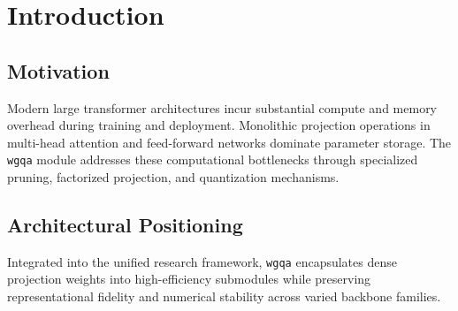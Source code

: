 \section{Introduction}

\subsection{Motivation}
Modern large transformer architectures incur substantial compute and memory overhead during training and deployment. Monolithic projection operations in multi-head attention and feed-forward networks dominate parameter storage. The \texttt{wgqa} module addresses these computational bottlenecks through specialized pruning, factorized projection, and quantization mechanisms.

\subsection{Architectural Positioning}
Integrated into the unified research framework, \texttt{wgqa} encapsulates dense projection weights into high-efficiency submodules while preserving representational fidelity and numerical stability across varied backbone families.
